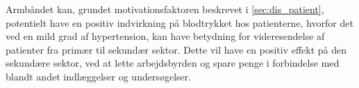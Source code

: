 Armbåndet kan, grundet motivationsfaktoren beskrevet i \autoref{sec:dis_patient}, potentielt have en positiv indvirkning på blodtrykket hos patienterne, hvorfor det ved en mild grad af hypertension, kan have betydning for videresendelse af patienter fra primær til sekundær sektor. Dette vil have en positiv effekt på den sekundære sektor, ved at lette arbejdsbyrden og spare penge i forbindelse med blandt andet indlæggelser og undersøgelser.

